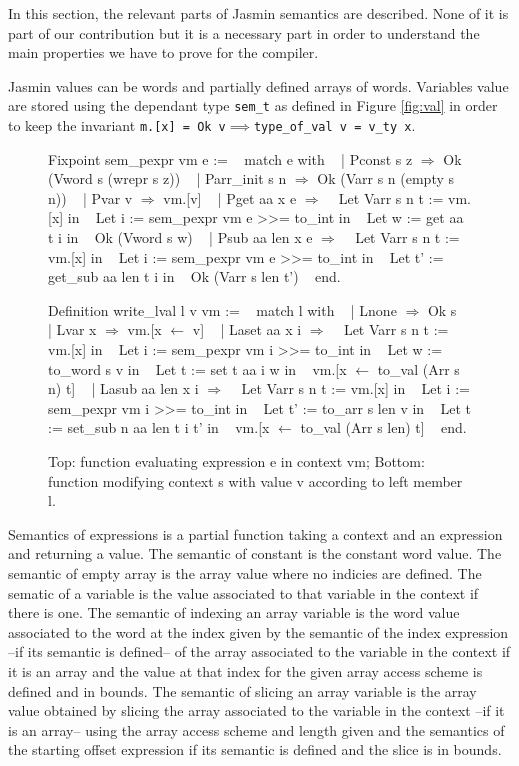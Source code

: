 \documentclass{article}
\begin{document}
In this section, the relevant parts of Jasmin semantics are described. None of
it is part of our contribution but it is a necessary part in order to understand
the main properties we have to prove for the compiler.

Jasmin values can be words and partially defined arrays of words. Variables value
are stored using the dependant type \texttt{sem\_t} as defined in Figure
\ref{fig:val} in order to keep the invariant
\texttt{m.[x] = Ok v\(\implies\)type\_of\_val v = v\_ty x}.

\medskip

\begin{figure}[!t]
\obeylines\obeyspaces\ttfamily%
Fixpoint sem\_pexpr vm e :=
~ match e with
~ | Pconst s z \(\Rightarrow\) Ok (Vword s (wrepr s z))
~ | Parr\_init s n \(\Rightarrow\) Ok (Varr s n (empty s n))
~ | Pvar v \(\Rightarrow\) vm.[v]
~ | Pget aa x e \(\Rightarrow\)
~   Let Varr s n t := vm.[x] in
~   Let i := sem\_pexpr vm e >{}>= to\_int in
~   Let w := get aa t i in
~   Ok (Vword s w)
~ | Psub aa len x e \(\Rightarrow\)
~   Let Varr s n t := vm.[x] in
~   Let i := sem\_pexpr vm e >{}>= to\_int in
~   Let t' := get\_sub aa len t i in
~   Ok (Varr s len t')
~ end.

Definition write\_lval l v vm :=
~ match l with
~ | Lnone \(\Rightarrow\) Ok s
~ | Lvar x \(\Rightarrow\) vm.[x \(\leftarrow\) v]
~ | Laset aa x i \(\Rightarrow\)
~   Let Varr s n t := vm.[x] in
~   Let i := sem\_pexpr vm i >{}>= to\_int in
~   Let w := to\_word s v in
~   Let t := set t aa i w in
~   vm.[x \(\leftarrow\) to\_val (Arr s n) t]
~ | Lasub aa len x i \(\Rightarrow\)
~   Let Varr s n t := vm.[x] in
~   Let i := sem\_pexpr vm i >{}>= to\_int in
~   Let t' := to\_arr s len v in 
~   Let t := set\_sub n aa len t i t' in
~   vm.[x \(\leftarrow\) to\_val (Arr s len) t]
~ end.
\normalfont%
\caption{Top: function evaluating expression e in context vm; %
Bottom: function modifying context s with value v according to left member l.}
\end{figure}

Semantics of expressions is a partial function taking a context and an
expression and returning a value.
The semantic of constant is the constant word value. The semantic of empty array
is the array value where no indicies are defined. The sematic of a variable is
the value associated to that variable in the context if there is one. The
semantic of indexing an array variable is the word value associated to the word
at the index given by the semantic of the index expression --if its semantic
is defined-- of the array associated to the variable in the context if it is an
array and the value at that index for the given array access scheme is defined
and in bounds. The semantic of slicing an array variable is the array value
obtained by slicing the array associated to the variable in the context --if it
is an array-- using the array access scheme and length given and the semantics
of the starting offset expression if its semantic is defined and the slice is in
bounds.
\end{document}
